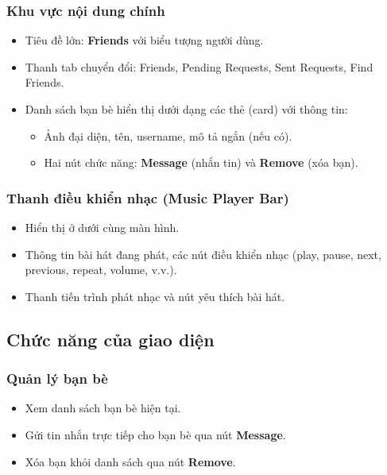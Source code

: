 \documentclass{book}
\begin{document}
\subsubsection{Khu vực nội dung chính}
\begin{itemize}
    \item Tiêu đề lớn: \textbf{Friends} với biểu tượng người dùng.
    \item Thanh tab chuyển đổi: Friends, Pending Requests, Sent Requests, Find Friends.
    \item Danh sách bạn bè hiển thị dưới dạng các thẻ (card) với thông tin:
    \begin{itemize}
        \item Ảnh đại diện, tên, username, mô tả ngắn (nếu có).
        \item Hai nút chức năng: \textbf{Message} (nhắn tin) và \textbf{Remove} (xóa bạn).
    \end{itemize}
\end{itemize}

\subsubsection{Thanh điều khiển nhạc (Music Player Bar)}
\begin{itemize}
    \item Hiển thị ở dưới cùng màn hình.
    \item Thông tin bài hát đang phát, các nút điều khiển nhạc (play, pause, next, previous, repeat, volume, v.v.).
    \item Thanh tiến trình phát nhạc và nút yêu thích bài hát.
\end{itemize}

\subsection{Chức năng của giao diện}

\subsubsection{Quản lý bạn bè}
\begin{itemize}
    \item Xem danh sách bạn bè hiện tại.
    \item Gửi tin nhắn trực tiếp cho bạn bè qua nút \textbf{Message}.
    \item Xóa bạn khỏi danh sách qua nút \textbf{Remove}.
\end{itemize}
\end{document}
